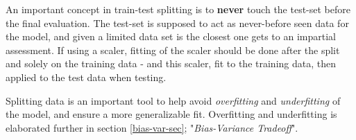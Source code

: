 An important concept in train-test splitting is to \textbf{never} touch the test-set before the final evaluation. The test-set is supposed to act as never-before seen data for the model, and given a limited data set is the closest one gets to an impartial assessment. 
If using a scaler, fitting of the scaler should be done after the split and solely on the training data - and this scaler, fit to the training data, then applied to the test data when testing. 

Splitting data is an important tool to help avoid \textit{overfitting} and \textit{underfitting} of the model, and ensure a more generalizable fit. Overfitting and underfitting is elaborated further in  section \ref{bias-var-sec}; "\textit{Bias-Variance Tradeoff}".










